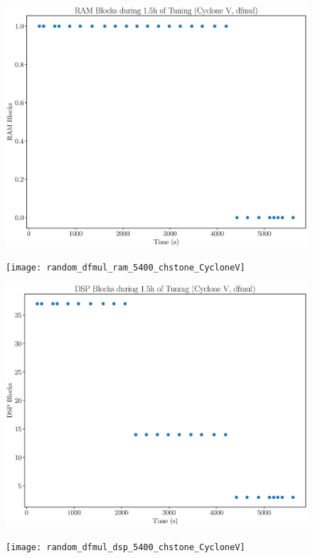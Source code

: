 \documentclass[12pt, a4paper]{article}
\begin{document}
\begin{figure}[htpb]
    \centering
    \noindent
    \begin{minipage}{.48\textwidth}
        \centering
        \includegraphics[scale=.25]{dfmul_ram_5400_chstone_CycloneV}
    \end{minipage}%
    \hfill
    \begin{minipage}{.48\textwidth}
        \centering
        \texttt{[image: random\_dfmul\_ram\_5400\_chstone\_CycloneV]}
    \end{minipage}%

    \begin{minipage}{.48\textwidth}
        \includegraphics[scale=.25]{dfmul_dsp_5400_chstone_CycloneV}
    \end{minipage}%
    \hfill
    \begin{minipage}{.48\textwidth}
        \texttt{[image: random\_dfmul\_dsp\_5400\_chstone\_CycloneV]}
    \end{minipage}%


\end{figure}
\end{document}
